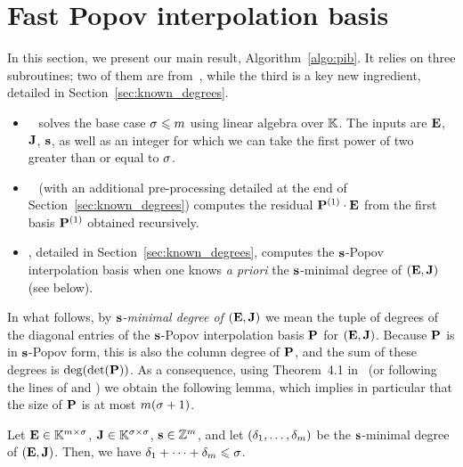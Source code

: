\documentclass[preprint]{sig-alternate-05-2015}
\begin{document}
\section{Fast Popov interpolation basis}
\label{sec:algo}
In this section, we present our main result, Algorithm~\ref{algo:pib}. It
relies on three subroutines; two of them are from~\cite{JeNeScVi15}, while the
third is a key new ingredient, detailed in Section~\ref{sec:known_degrees}.
\begin{itemize}
  \item {}~\cite[Algorithm~9]{JeNeScVi15}
    solves the base case $\sigma \leqslant m$ using linear algebra over $\mathbb{K}$.
    The inputs are $\evMat$, $\mulmat$, $\mathbf{s}$, as well as an integer
    for which we can take the first power of two greater than or equal
    to $\sigma$.
  \item {}~\cite[Algorithm~5]{JeNeScVi15}
    (with an additional pre-processing detailed at the end of
    Section~\ref{sec:known_degrees}) computes the residual $\intBasis^{(1)}
    \mul \evMat$ from the first basis $\intBasis^{(1)}$ obtained recursively.
  \item {}, detailed in Section~\ref{sec:known_degrees},
    computes the $\mathbf{s}$-Popov interpolation basis when one knows \emph{a
    priori} the $\mathbf{s}$-minimal degree of $(\evMat,\mulmat)$ (see below).
\end{itemize}

In what follows, by \emph{$\mathbf{s}$-minimal degree of $(\evMat,\mulmat)$} we
mean the tuple of degrees of the diagonal entries of the $\mathbf{s}$-Popov
interpolation basis $\intBasis$ for $(\evMat,\mulmat)$. Because $\intBasis$ is
in $\mathbf{s}$-Popov form, this is also the column degree of $\intBasis$, and the
sum of these degrees is $\deg(\det(\intBasis))$. As a consequence, using
Theorem~4.1 in~\cite{BarBul92} (or following the lines of \cite{Kailath80} and
\cite{BecLab00}) we obtain the following lemma, which implies in particular
that the size of $\intBasis$ is at most $m (\sigma+1)$.

\begin{lem}
  \label{lem:mindeg}
  Let $\evMat \in \evSpace{\order}$, $\mulmat \in \matSpace[\order]$, $\mathbf{s}
  \in \mathbb{Z}^{m}$, and let $(\delta_1,\ldots,\delta_m)$ be the
  $\mathbf{s}$-minimal degree of $(\evMat,\mulmat)$. Then, we have $\delta_1 +
  \cdots + \delta_m \leqslant \sigma$.
\end{lem}
\end{document}
